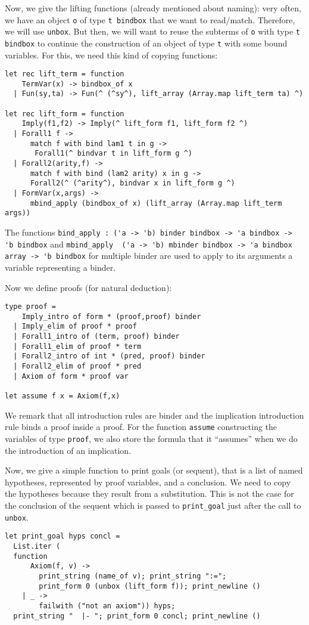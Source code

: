 \documentclass[11pt]{article}
\begin{document}
Now, we give the lifting functions (already mentioned about naming): very often, we have
an object \verb#o# of type \verb#t bindbox# that we want to
read/match. Therefore, we will use \verb#unbox#.
But then, we will want to reuse the subterms of \verb#o# with
type  \verb#t bindbox# to continue the construction of an object of
type \verb#t# with some bound variables. For this, we need this kind
of copying functions:

\begin{verbatim}
let rec lift_term = function
    TermVar(x) -> bindbox_of x
  | Fun(sy,ta) -> Fun(^ (^sy^), lift_array (Array.map lift_term ta) ^)

let rec lift_form = function
    Imply(f1,f2) -> Imply(^ lift_form f1, lift_form f2 ^)
  | Forall1 f ->
      match f with bind lam1 t in g ->
       Forall1(^ bindvar t in lift_form g ^)
  | Forall2(arity,f) ->
      match f with bind (lam2 arity) x in g ->
      Forall2(^ (^arity^), bindvar x in lift_form g ^)
  | FormVar(x,args) ->
      mbind_apply (bindbox_of x) (lift_array (Array.map lift_term args))
\end{verbatim}

The functions
\verb#bind_apply : ('a -> 'b) binder bindbox -> 'a bindbox -> 'b bindbox# and
\verb#mbind_apply  ('a -> 'b) mbinder bindbox -> 'a bindbox array -> 'b bindbox#
for multiple binder are
used to apply to its arguments a variable representing a binder.

Now we define proofs (for natural deduction):
\begin{verbatim}
type proof =
    Imply_intro of form * (proof,proof) binder
  | Imply_elim of proof * proof
  | Forall1_intro of (term, proof) binder
  | Forall1_elim of proof * term
  | Forall2_intro of int * (pred, proof) binder
  | Forall2_elim of proof * pred
  | Axiom of form * proof var

let assume f x = Axiom(f,x)
\end{verbatim}

We remark that all introduction rules are binder and the
implication introduction rule binds a proof inside a proof.
For the function \verb#assume# constructing the variables of type
\verb#proof#, we also store the formula that it ``assumes'' when we do
the introduction of an implication.

Now, we give a simple function to print goals (or sequent), that is a
list of named hypotheses, represented by proof variables, and a
conclusion. We need to copy the hypotheses because they result from a
substitution. This is not the case for the conclusion of the sequent
which is passed to \verb#print_goal# just after the call to \verb#unbox#.
\begin{verbatim}
let print_goal hyps concl =
  List.iter (
  function
      Axiom(f, v) ->
        print_string (name_of v); print_string ":=";
        print_form 0 (unbox (lift_form f)); print_newline ()
    | _ ->
        failwith ("not an axiom")) hyps;
  print_string "  |- "; print_form 0 concl; print_newline ()
\end{verbatim}
\end{document}
